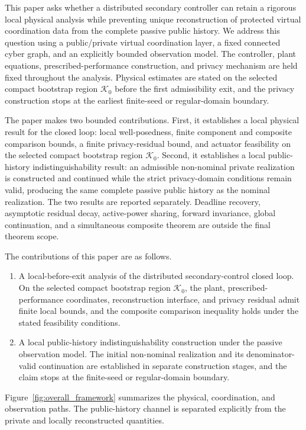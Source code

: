 \documentclass[journal]{IEEEtran}
\begin{document}
This paper asks whether a distributed secondary controller can retain a rigorous local physical analysis while preventing unique reconstruction of protected virtual coordination data from the complete passive public history. We address this question using a public/private virtual coordination layer, a fixed connected cyber graph, and an explicitly bounded observation model. The controller, plant equations, prescribed-performance construction, and privacy mechanism are held fixed throughout the analysis. Physical estimates are stated on the selected compact bootstrap region $\mathcal K_0$ before the first admissibility exit, and the privacy construction stops at the earliest finite-seed or regular-domain boundary.

The paper makes two bounded contributions. First, it establishes a local physical result for the closed loop: local well-posedness, finite component and composite comparison bounds, a finite privacy-residual bound, and actuator feasibility on the selected compact bootstrap region $\mathcal K_0$. Second, it establishes a local public-history indistinguishability result: an admissible non-nominal private realization is constructed and continued while the strict privacy-domain conditions remain valid, producing the same complete passive public history as the nominal realization. The two results are reported separately. Deadline recovery, asymptotic residual decay, active-power sharing, forward invariance, global continuation, and a simultaneous composite theorem are outside the final theorem scope.

The contributions of this paper are as follows.
\begin{enumerate}
    \item A local-before-exit analysis of the distributed secondary-control closed loop. On the selected compact bootstrap region $\mathcal K_0$, the plant, prescribed-performance coordinates, reconstruction interface, and privacy residual admit finite local bounds, and the composite comparison inequality holds under the stated feasibility conditions.
    \item A local public-history indistinguishability construction under the passive observation model. The initial non-nominal realization and its denominator-valid continuation are established in separate construction stages, and the claim stops at the finite-seed or regular-domain boundary.
\end{enumerate}

Figure~\ref{fig:overall_framework} summarizes the physical, coordination, and
observation paths. The public-history channel is separated explicitly from the
private and locally reconstructed quantities.
\end{document}
